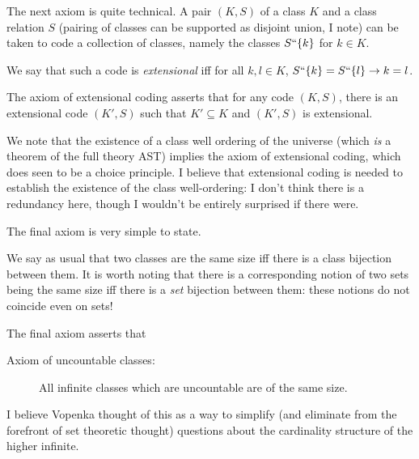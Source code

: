 \documentclass{slides}
\begin{document}
\begin{slide}

The next axiom is quite technical.  A pair $(K,S)$ of a class $K$ and a class relation $S$ (pairing of classes can be supported as disjoint union, I note) can be taken to code a collection of classes, namely the classes $S``\{k\}$ for $k \in K$.

We say that such a code is {\em extensional\/} iff for all $k,l \in K$, $S``\{k\} = S``\{l\} \rightarrow k=l$.

The axiom of extensional coding asserts that for any code $(K,S)$, there is an extensional code $(K',S)$ such that
$K' \subseteq K$ and $(K',S)$ is extensional.

We note that the existence of a class well ordering of the universe (which {\em is\/} a theorem of the full theory AST) implies the axiom of extensional coding, which does seen to be a choice principle.  I believe that extensional coding is needed to establish the existence of the class well-ordering:  I don't think there is a redundancy here, though I wouldn't be entirely surprised if there were.

\end{slide}

\begin{slide}

The final axiom is very simple to state.

We say as usual that two classes are the same size iff there is a class bijection between them.  It is worth noting that there is a corresponding notion of two sets being the same size iff there is a {\em set\/} bijection between them:  these notions do not coincide even on sets!

The final axiom asserts that 

\begin{description}

\item[Axiom of uncountable classes:]  All infinite classes which are uncountable are of the same size.

\end{description}  I believe Vopenka thought of this as a way to simplify (and eliminate from the forefront of set theoretic thought) questions about the cardinality structure of the higher infinite.

\end{slide}
\end{document}
